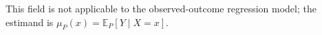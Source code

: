 This field is not applicable to the observed-outcome regression model; the estimand is \(\mu_P(x)=\mathbb E_P[Y\mid X=x]\).